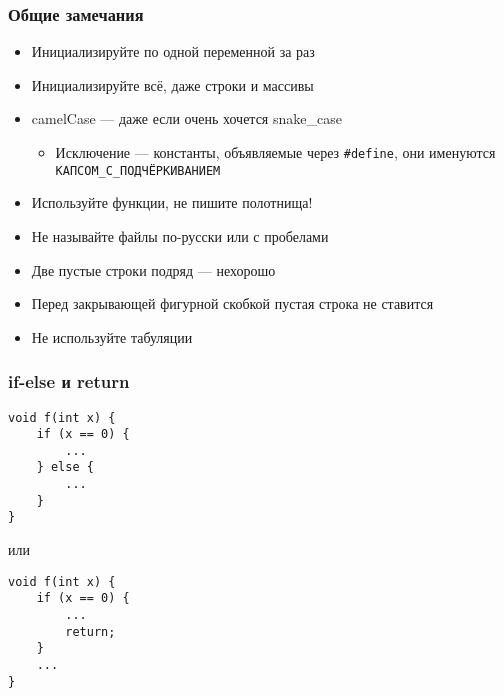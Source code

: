 \documentclass{../../slides-style}
\begin{document}
    
    \begin{frame}[plain]
        \titlepage
    \end{frame}

    \begin{frame}[fragile]
        \frametitle{Общие замечания}
        \begin{itemize}
            \item Инициализируйте по одной переменной за раз
            \item Инициализируйте всё, даже строки и массивы
            \item camelCase --- даже если очень хочется snake\_case
            \begin{itemize}
                \item Исключение --- константы, объявляемые через \texttt{#define}, они именуются \texttt{КАПСОМ_С_ПОДЧЁРКИВАНИЕМ}
            \end{itemize}
            \item Используйте функции, не пишите полотнища!
            \item Не называйте файлы по-русски или с пробелами
            \item Две пустые строки подряд --- нехорошо
            \item Перед закрывающей фигурной скобкой пустая строка не ставится
            \item Не используйте табуляции
        \end{itemize}
    \end{frame}

    \begin{frame}[fragile]
        \frametitle{if-else и return}
        \begin{verbatim}
void f(int x) {
    if (x == 0) {
        ...
    } else {
        ...
    }
}
        \end{verbatim}
        или
        \begin{verbatim}
void f(int x) {
    if (x == 0) {
        ...
        return;
    } 
    ...
}
        \end{verbatim}
    \end{frame}
\end{document}
